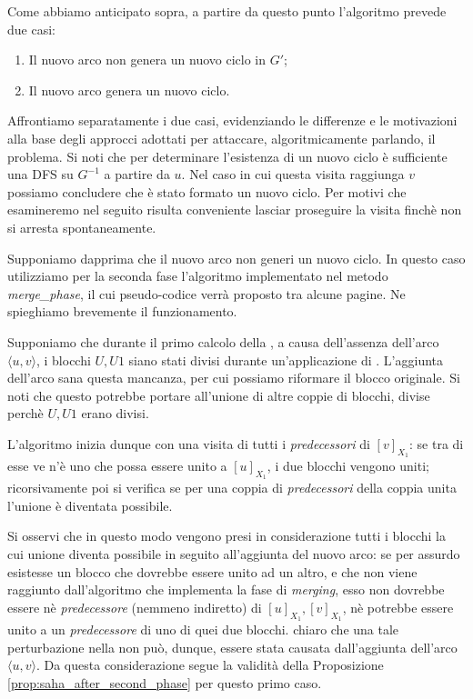 Come abbiamo anticipato sopra, a partire da questo punto l'algoritmo prevede due casi:
\begin{enumerate}
    \item Il nuovo arco non genera un nuovo ciclo in $G'$;
    \item Il nuovo arco genera un nuovo ciclo.
\end{enumerate}
Affrontiamo separatamente i due casi, evidenziando le differenze e le motivazioni alla base degli approcci adottati per attaccare, algoritmicamente parlando, il problema. Si noti che per determinare l'esistenza di un nuovo ciclo è sufficiente una DFS su $G^{-1}$ a partire da $u$. Nel caso in cui questa visita raggiunga $v$ possiamo concludere che è stato formato un nuovo ciclo. Per motivi che esamineremo nel seguito risulta conveniente lasciar proseguire la visita finchè non si arresta spontaneamente.

Supponiamo dapprima che il nuovo arco non generi un nuovo ciclo. In questo caso utilizziamo per la seconda fase l'algoritmo implementato nel metodo \emph{merge\_phase}, il cui pseudo-codice verrà proposto tra alcune pagine. Ne spieghiamo brevemente il funzionamento.

Supponiamo che durante il primo calcolo della \rscpnomath, a causa dell'assenza dell'arco $\langle u, v \rangle$, i blocchi $U,U1$ siano stati divisi durante un'applicazione di \splitfunc. L'aggiunta dell'arco sana questa mancanza, per cui possiamo riformare il blocco originale. Si noti che questo potrebbe portare all'unione di altre coppie di blocchi, divise perchè $U,U1$ erano divisi.

L'algoritmo inizia dunque con una visita di tutti i \emph{predecessori} di $[v]_{X_1}$: se tra di esse ve n'è uno che possa essere unito a $[u]_{X_1}$, i due blocchi vengono uniti; ricorsivamente poi si verifica se per una coppia di \emph{predecessori} della coppia unita l'unione è diventata possibile.

Si osservi che in questo modo vengono presi in considerazione tutti i blocchi la cui unione diventa possibile in seguito all'aggiunta del nuovo arco: se per assurdo esistesse un blocco che dovrebbe essere unito ad un altro, e che non viene raggiunto dall'algoritmo che implementa la fase di \emph{merging}, esso non dovrebbe essere nè \emph{predecessore} (nemmeno indiretto) di $[u]_{X_1}, [v]_{X_1}$, nè potrebbe essere unito a un \emph{predecessore} di uno di quei due blocchi. \accente chiaro che una tale perturbazione nella \rscpnomath non può, dunque, essere stata causata dall'aggiunta dell'arco $\langle u,v \rangle$. Da questa considerazione segue la validità della Proposizione \ref{prop:saha_after_second_phase} per questo primo caso.


